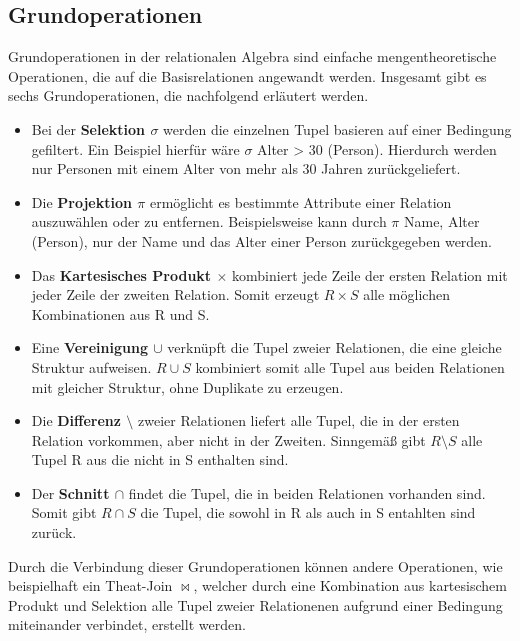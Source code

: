 \subsection{Grundoperationen} %
\label{sec:grundoperationen}
Grundoperationen in der relationalen Algebra sind einfache mengentheoretische Operationen, die auf die Basisrelationen angewandt werden. Insgesamt gibt es sechs Grundoperationen, die nachfolgend erläutert werden.
\begin{itemize}
\item Bei der \textbf{Selektion $\sigma$} werden die einzelnen Tupel basieren auf einer Bedingung gefiltert. Ein Beispiel hierfür wäre  \colorbox{gray!20}{$\sigma$ Alter > 30 (Person)}. Hierdurch werden nur Personen mit einem Alter von mehr als 30 Jahren zurückgeliefert.
\item Die \textbf{Projektion $\pi$} ermöglicht es bestimmte Attribute einer Relation auszuwählen oder zu entfernen. Beispielsweise kann durch \colorbox{gray!20}{$\pi$ Name, Alter (Person)}, nur der Name und das Alter einer Person zurückgegeben werden.
\item Das \textbf{Kartesisches Produkt $\times$} kombiniert jede Zeile der ersten Relation mit jeder Zeile der zweiten Relation. Somit erzeugt  \colorbox{gray!20}{$R \times S$} alle möglichen Kombinationen aus \colorbox{gray!20}{R} und \colorbox{gray!20}{S}.
\item Eine \textbf{Vereinigung $\cup$} verknüpft die Tupel zweier Relationen, die eine gleiche Struktur aufweisen.  \colorbox{gray!20}{$R \cup S$} kombiniert somit alle Tupel aus beiden Relationen mit gleicher Struktur, ohne Duplikate zu erzeugen.
\item Die \textbf{Differenz  $\setminus$} zweier Relationen liefert alle Tupel, die in der ersten Relation vorkommen, aber nicht in der Zweiten. Sinngemäß gibt \colorbox{gray!20}{$R \setminus S$} alle Tupel \colorbox{gray!20}{R} aus die nicht in \colorbox{gray!20}{S} enthalten sind.
\item Der \textbf{Schnitt $\cap$} findet die Tupel, die in beiden Relationen vorhanden sind. Somit gibt \colorbox{gray!20}{$R \cap S$} die Tupel, die sowohl in \colorbox{gray!20}{R} als auch in \colorbox{gray!20}{S} entahlten sind zurück.
\end{itemize}
\noindent Durch die Verbindung dieser Grundoperationen können andere Operationen, wie beispielhaft ein Theat-Join $\bowtie$, welcher durch eine Kombination aus kartesischem Produkt und Selektion alle Tupel zweier Relationenen aufgrund einer Bedingung miteinander verbindet, erstellt werden.  \citep{rdb}

